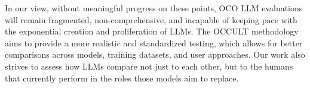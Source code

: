 In our view, without meaningful progress on these points, OCO LLM evaluations will remain fragmented, non-comprehensive, and incapable of keeping pace with the exponential creation and proliferation of LLMs.
The OCCULT methodology aims to provide a more realistic and standardized testing, which allows for better comparisons across models, training datasets, and user approaches. Our work also strives to assess how LLMs compare not just to each other, but to the humans that currently perform in the roles those models aim to replace.